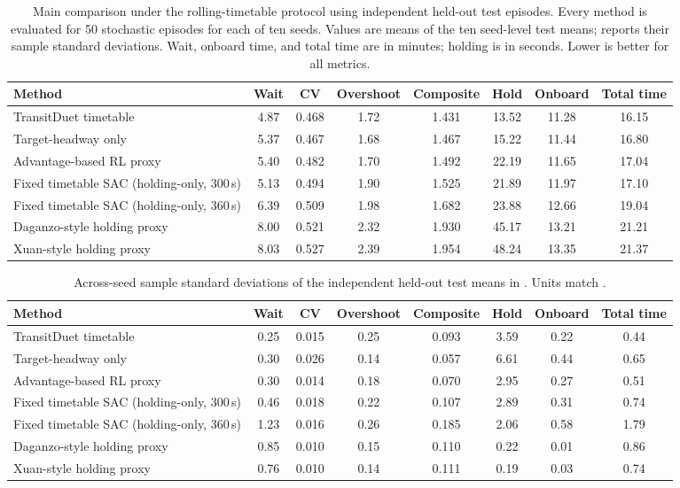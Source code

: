 \begin{table}[H]
\centering
\caption{Main comparison under the rolling-timetable protocol using independent held-out test episodes. Every method is evaluated for 50 stochastic episodes for each of ten seeds. Values are means of the ten seed-level test means;  reports their sample standard deviations. Wait, onboard time, and total time are in minutes; holding is in seconds. Lower is better for all metrics.}
\label{tab:main_results}
\scriptsize
\setlength{\tabcolsep}{2.2pt}
\begin{tabular}{@{}lccccccc@{}}
\toprule
Method & Wait & CV & Overshoot & Composite & Hold & Onboard & Total time \\
\midrule
TransitDuet timetable & 4.87 & 0.468 & 1.72 & 1.431 & 13.52 & 11.28 & 16.15 \\
Target-headway only & 5.37 & 0.467 & 1.68 & 1.467 & 15.22 & 11.44 & 16.80 \\
Advantage-based RL proxy & 5.40 & 0.482 & 1.70 & 1.492 & 22.19 & 11.65 & 17.04 \\
Fixed timetable SAC (holding-only, 300\,s) & 5.13 & 0.494 & 1.90 & 1.525 & 21.89 & 11.97 & 17.10 \\
Fixed timetable SAC (holding-only, 360\,s) & 6.39 & 0.509 & 1.98 & 1.682 & 23.88 & 12.66 & 19.04 \\
Daganzo-style holding proxy & 8.00 & 0.521 & 2.32 & 1.930 & 45.17 & 13.21 & 21.21 \\
Xuan-style holding proxy & 8.03 & 0.527 & 2.39 & 1.954 & 48.24 & 13.35 & 21.37 \\
\bottomrule
\end{tabular}
\end{table}

\begin{table}[H]
\centering
\caption{Across-seed sample standard deviations of the independent held-out test means in . Units match .}
\label{tab:main_variability}
\scriptsize
\setlength{\tabcolsep}{2.2pt}
\begin{tabular}{@{}lccccccc@{}}
\toprule
Method & Wait & CV & Overshoot & Composite & Hold & Onboard & Total time \\
\midrule
TransitDuet timetable & 0.25 & 0.015 & 0.25 & 0.093 & 3.59 & 0.22 & 0.44 \\
Target-headway only & 0.30 & 0.026 & 0.14 & 0.057 & 6.61 & 0.44 & 0.65 \\
Advantage-based RL proxy & 0.30 & 0.014 & 0.18 & 0.070 & 2.95 & 0.27 & 0.51 \\
Fixed timetable SAC (holding-only, 300\,s) & 0.46 & 0.018 & 0.22 & 0.107 & 2.89 & 0.31 & 0.74 \\
Fixed timetable SAC (holding-only, 360\,s) & 1.23 & 0.016 & 0.26 & 0.185 & 2.06 & 0.58 & 1.79 \\
Daganzo-style holding proxy & 0.85 & 0.010 & 0.15 & 0.110 & 0.22 & 0.01 & 0.86 \\
Xuan-style holding proxy & 0.76 & 0.010 & 0.14 & 0.111 & 0.19 & 0.03 & 0.74 \\
\bottomrule
\end{tabular}
\end{table}

